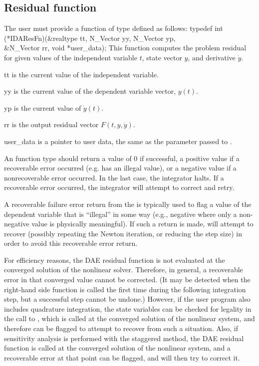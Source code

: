 {\subsection{Residual function}\label{ss:resFn}
The user must provide a function of type  defined as follows:
{
  typedef int (*IDAResFn)(&realtype tt, N\_Vector yy, N\_Vector yp,  \\
                          &N\_Vector rr, void *user\_data);
}
{
  This function computes the problem residual for given values
  of the independent variable $t$, state vector $y$, and derivative $\dot{y}$.
}
{
  \begin{args}
  \item[tt]
    is the current value of the independent variable.
  \item[yy]
    is the current value of the dependent variable vector, $y(t)$.
  \item[yp]
    is the current value of $\dot{y}(t)$.
  \item[rr]
    is the output residual vector $F(t,y,\dot{y})$.
  \item[user\_data]
    is a pointer to user data, the same as the       
    parameter passed to .   
  \end{args}
}
{
  An  function type should return a value of $0$ if successful, 
  a positive value if a recoverable error occurred (e.g.  has an illegal
  value), or a negative value if a nonrecoverable error occurred. 
  In the last case, the integrator halts. 
  If a recoverable error occurred, the integrator will attempt to correct and retry.
}
{
  A recoverable failure error return from the  is typically used to
  flag a value of the dependent variable  that is ``illegal'' in
  some way (e.g., negative where only a non-negative value is physically
  meaningful).  If such a return is made, {\idas} will attempt to recover
  (possibly repeating the Newton iteration, or reducing the step size)
  in order to avoid this recoverable error return.

  For efficiency reasons, the DAE residual function is not evaluated
  at the converged solution of the nonlinear solver. Therefore, in general, a
  recoverable error in that converged value cannot be corrected.  (It may be
  detected when the right-hand side function is called the first time during
  the following integration step, but a successful step cannot be undone.) 
  However, if the user program also includes quadrature integration, the
  state variables can be checked for legality in the call to
  , which is called at the converged solution of the
  nonlinear system, and therefore {\idas} can be flagged to attempt
  to recover from such a situation. Also, if sensitivity analysis is
  performed with the staggered method, the DAE residual
  function is called at the converged solution of the nonlinear system,
  and a recoverable error at that point can be flagged, and {\idas}
  will then try to correct it.

}}

